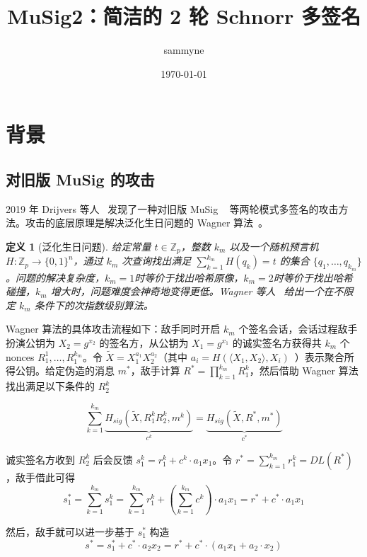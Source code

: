 \documentclass[a4paper,10pt]{article}
\title{MuSig2：简洁的 2 轮 Schnorr 多签名}
\author{sammyne}
\date{\today}
\newcommand{\bZ}{\mathbb{Z}}
\newtheorem{definition}{\bf 定义}[section]
\begin{document}
\maketitle

\section{背景}

\subsection{对旧版 MuSig 的攻击}
2019 年 Drijvers 等人~\cite{2019On} 发现了一种对旧版 MuSig ~\cite{cryptoeprint:2018:068:20180118:124757} 等两轮模式多签名的攻击方法。攻击的底层原理是解决泛化生日问题的 Wagner 算法~\cite{wagner2002generalized}。

\begin{definition}[泛化生日问题]
  给定常量 \(t\in \bZ_p\)，整数 \(k_m\) 以及一个随机预言机 \(H: \bZ_p\rightarrow \{0,1\}^n\)，通过 \(k_m\) 次查询找出满足 \(\sum_{k=1}^{k_m}H(q_k)=t\) 的集合 \(\{q_1,\dots,q_{k_m}\}\)。问题的解决复杂度，\(k_m=1\)时等价于找出哈希原像，\(k_m=2\)时等价于找出哈希碰撞，\(k_m\) 增大时，问题难度会神奇地变得更低。Wagner 等人~\cite{wagner2002generalized} 给出一个在不限定 \(k_m\) 条件下的次指数级别算法。
\end{definition}

Wagner 算法的具体攻击流程如下：敌手同时开启 \(k_m\) 个签名会话，会话过程敌手扮演公钥为 \(X_2=g^{x_2}\) 的签名方，从公钥为 \(X_1=g^{x_1}\) 的诚实签名方获得共 \(k_m\) 个 nonces \(R_1^1,\dots,R_1^{k_m}\)。令 \(\tilde{X}=X_1^{a_1}X_2^{a_2}\)（其中 \(a_i=H(\langle X_1,X_2\rangle,X_i)\)~\cite{cryptoeprint:2018:068:20180118:124757}）表示聚合所得公钥。给定伪造的消息 \(m^*\)，敌手计算 \(R^*=\prod_{k=1}^{k_m} R_1^k\)，然后借助 Wagner 算法找出满足以下条件的 \(R_2^k\)

\begin{equation}\label{fake-R2}
  \sum_{k=1}^{k_m} \underbrace{H_{sig}(\tilde{X},R_1^k R_2^k,m^k)}_{c^k} = \underbrace{H_{sig}(\tilde{X},R^*,m^*)}_{c^*}
\end{equation}

诚实签名方收到 \(R_2^k\) 后会反馈 \(s_1^k=r_1^k+c^k\cdot a_1x_1\)。令 \(r^*=\sum_{k=1}^{k_m}r_1^k=DL(R^*)\)，敌手借此可得
\[
  s_1^* = \sum_{k=1}^{k_m} s_1^k = \sum_{k=1}^{k_m} r_1^k + \left(\sum_{k=1}^{k_m} c^k\right)\cdot a_1x_1 = r^*+c^*\cdot a_1x_1
\]

然后，敌手就可以进一步基于 \(s_1^*\) 构造 
\[
  s^* = s_1^* + c^*\cdot a_2x_2 = r^* + c^*\cdot (a_1x_1+a_2\cdot x_2)
\]
\end{document}

